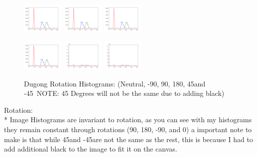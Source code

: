 \documentclass[conference]{IEEEtran}
\begin{document}
\begin{figure}[H]
    \centerline{
        {\includegraphics[width=20mm, scale=0.5]{./figures/RotationHists/Dugongneutral Hist.png}}
        {\includegraphics[width=20mm, scale=0.5]{./figures/RotationHists/Dugongdeg90 Hist.png}}
        {\includegraphics[width=20mm, scale=0.5]{./figures/RotationHists/Dugongdegn90 Hist.png}}
    }
    \centerline{
        {\includegraphics[width=20mm, scale=0.5]{./figures/RotationHists/Dugongflipped Hist.png}}
        {\includegraphics[width=20mm, scale=0.5]{./figures/RotationHists/Dugongdeg45 Hist.png}}
        {\includegraphics[width=20mm, scale=0.5]{./figures/RotationHists/Dugongdegn45 Hist.png}}
    }
    \caption{Dugong Rotation Histograms: (Neutral, -90\degree, 90\degree, 180\degree, 45\degree and -45\degree\ NOTE: 45 Degrees will not be the same due to adding black)}
    \label{fig}
\end{figure}
Rotation: \\*
Image Histograms are invariant to rotation, as you can see with my histograms they remain constant through rotations (90\degree, 180\degree, -90\degree, and 0\degree)
a important note to make is that while 45\degree and -45\degree are not the same as the rest, this is because I had to add additional black to the image to fit it on the canvas.\\
\end{document}

